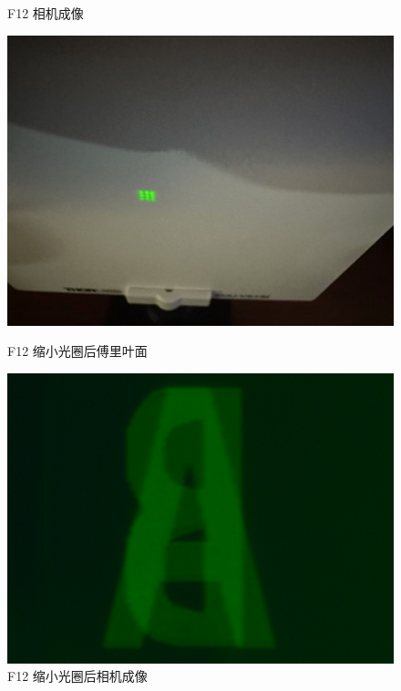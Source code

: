 \documentclass{ctexart}
\begin{document}
\begin{figure}[H]
\begin{minipage}[b]{0.2\textwidth}
    \caption{F12 相机成像}
  \end{minipage}
  \hspace{0.05\textwidth} %
  \begin{minipage}[b]{0.2\textwidth}
    \centering
    \includegraphics[width=\textwidth]{pictures/微信图片_20241017164751.jpg}
    \caption{F12 缩小光圈后傅里叶面}
  \end{minipage}
  \begin{minipage}[b]{0.2\textwidth}
    \centering
    \includegraphics[width=\textwidth]{pictures/F12-mask-Ex26.png}
    \caption{F12 缩小光圈后相机成像}
  \end{minipage}
\end{figure}
\end{document}
